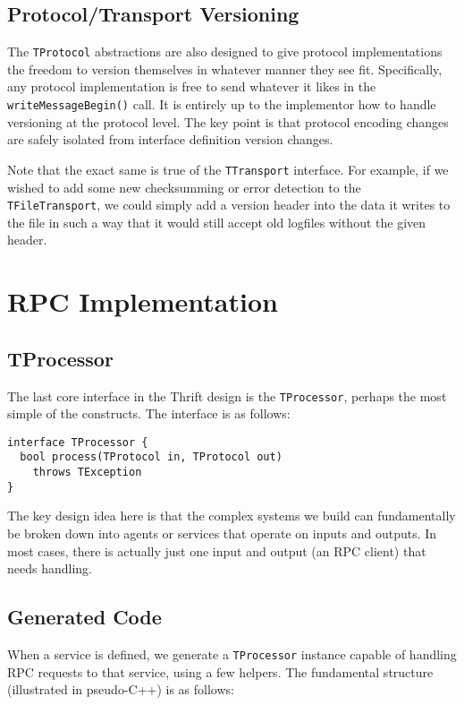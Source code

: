 \documentclass[nocopyrightspace,blockstyle]{sigplanconf}
\begin{document}
\subsection{Protocol/Transport Versioning}
The \texttt{TProtocol} abstractions are also designed to give protocol
implementations the freedom to version themselves in whatever manner they
see fit. Specifically, any protocol implementation is free to send whatever
it likes in the \texttt{writeMessageBegin()} call. It is entirely up to the
implementor how to handle versioning at the protocol level. The key point is
that protocol encoding changes are safely isolated from interface definition
version changes.

Note that the exact same is true of the \texttt{TTransport} interface. For
example, if we wished to add some new checksumming or error detection to the
\texttt{TFileTransport}, we could simply add a version header into the
data it writes to the file in such a way that it would still accept old
logfiles without the given header.

\section{RPC Implementation}

\subsection{TProcessor}

The last core interface in the Thrift design is the \texttt{TProcessor},
perhaps the most simple of the constructs. The interface is as follows:

\begin{verbatim}
interface TProcessor {
  bool process(TProtocol in, TProtocol out)
    throws TException
}
\end{verbatim}

The key design idea here is that the complex systems we build can fundamentally
be broken down into agents or services that operate on inputs and outputs. In
most cases, there is actually just one input and output (an RPC client) that
needs handling.

\subsection{Generated Code}

When a service is defined, we generate a
\texttt{TProcessor} instance capable of handling RPC requests to that service,
using a few helpers. The fundamental structure (illustrated in pseudo-C++) is
as follows:
\end{document}
